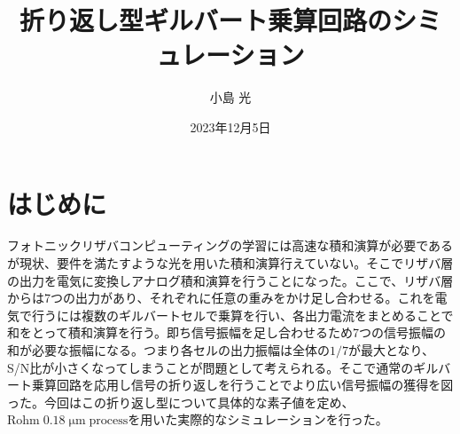 \documentclass[twocolumn]{jsarticle}
\begin{document}
\title{折り返し型ギルバート乗算回路のシミュレーション}
\author{小島 光}
\date{2023年12月5日}
\maketitle


\section{はじめに}
    フォトニックリザバコンピューティングの学習には高速な積和演算が必要であるが現状、要件を満たすような光を用いた積和演算行えていない。そこでリザバ層の出力を電気に変換しアナログ積和演算を行うことになった。ここで、リザバ層からは7つの出力があり、それぞれに任意の重みをかけ足し合わせる。これを電気で行うには複数のギルバートセルで乗算を行い、各出力電流をまとめることで和をとって積和演算を行う。即ち信号振幅を足し合わせるため7つの信号振幅の和が必要な振幅になる。つまり各セルの出力振幅は全体の$1/7$が最大となり、S/N比が小さくなってしまうことが問題として考えられる。そこで通常のギルバート乗算回路を応用し信号の折り返しを行うことでより広い信号振幅の獲得を図った。今回はこの折り返し型について具体的な素子値を定め、$\mathrm{Rohm\;0.18\;\mu m\;process}$を用いた実際的なシミュレーションを行った。
\end{document}
